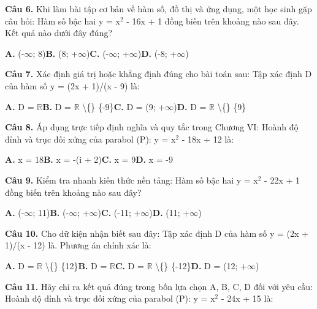 \documentclass[11pt,a4paper]{article}
\begin{document}
\textbf{\color{primary} Câu 6.} Khi làm bài tập cơ bản về hàm số, đồ thị và ứng dụng, một học sinh gặp câu hỏi: Hàm số bậc hai y = x$^2$ - 16x + 1 đồng biến trên khoảng nào sau đây. Kết quả nào dưới đây đúng?\par
\hspace*{1.5em}\textbf{A.} (-$\infty$; 8)\quad\quad \textbf{B.} (8; +$\infty$)\quad\quad \textbf{C.} (-$\infty$; +$\infty$)\quad\quad \textbf{D.} (-8; +$\infty$)\par\vspace{2pt}
\textbf{\color{primary} Câu 7.} Xác định giá trị hoặc khẳng định đúng cho bài toán sau: Tập xác định D của hàm số y = (2x + 1)/(x - 9) là:\par
\hspace*{1.5em}\textbf{A.} D = $\mathbb{R}$\quad\quad \textbf{B.} D = $\mathbb{R}$ \textbackslash\{\} \{-9\}\quad\quad \textbf{C.} D = (9; +$\infty$)\quad\quad \textbf{D.} D = $\mathbb{R}$ \textbackslash\{\} \{9\}\par\vspace{2pt}
\textbf{\color{primary} Câu 8.} Áp dụng trực tiếp định nghĩa và quy tắc trong Chương VI: Hoành độ đỉnh và trục đối xứng của parabol (P): y = x$^2$ - 18x + 12 là:\par
\hspace*{1.5em}\textbf{A.} x = 18\quad\quad \textbf{B.} x = -(i + 2)\quad\quad \textbf{C.} x = 9\quad\quad \textbf{D.} x = -9\par\vspace{2pt}
\textbf{\color{primary} Câu 9.} Kiểm tra nhanh kiến thức nền tảng: Hàm số bậc hai y = x$^2$ - 22x + 1 đồng biến trên khoảng nào sau đây?\par
\hspace*{1.5em}\textbf{A.} (-$\infty$; 11)\quad\quad \textbf{B.} (-$\infty$; +$\infty$)\quad\quad \textbf{C.} (-11; +$\infty$)\quad\quad \textbf{D.} (11; +$\infty$)\par\vspace{2pt}
\textbf{\color{primary} Câu 10.} Cho dữ kiện nhận biết sau đây: Tập xác định D của hàm số y = (2x + 1)/(x - 12) là. Phương án chính xác là:\par
\hspace*{1.5em}\textbf{A.} D = $\mathbb{R}$ \textbackslash\{\} \{12\}\quad\quad \textbf{B.} D = $\mathbb{R}$\quad\quad \textbf{C.} D = $\mathbb{R}$ \textbackslash\{\} \{-12\}\quad\quad \textbf{D.} D = (12; +$\infty$)\par\vspace{2pt}
\textbf{\color{primary} Câu 11.} Hãy chỉ ra kết quả đúng trong bốn lựa chọn A, B, C, D đối với yêu cầu: Hoành độ đỉnh và trục đối xứng của parabol (P): y = x$^2$ - 24x + 15 là:\par
\end{document}

